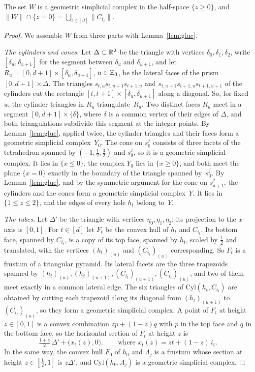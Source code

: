 \begin{lemma}\label{lem:column}
The set $W$ is a geometric simplicial complex in the half-space $\{z\ge0\}$, and $\lVert W\rVert\cap{\{z=0\}}=\bigcup_{t\in[d]}\lVert C_{i_t}\rVert$.
\end{lemma}

\begin{proof}
We assemble $W$ from three parts with Lemma~\ref{lem:glue}.

\emph{The cylinders and cones.}
Let $\Delta\subset\mathbb{R}^2$ be the triangle with vertices $\delta_0,\delta_1,\delta_2$, write $[\delta_u,\delta_{u+1}]$ for the segment between $\delta_u$ and $\delta_{u+1}$, and let $R_u=[0,d+1]\times[\delta_u,\delta_{u+1}]$, $u\in\mathbb{Z}_3$, be the lateral faces of the prism $[0,d+1]\times\Delta$.
The triangles $s_{t,u}s_{t,u+1}s_{t+1,u}$ and $s_{t,u+1}s_{t+1,u}s_{t+1,u+1}$ of the cylinders cut the rectangle $[t,t+1]\times[\delta_u,\delta_{u+1}]$ along a diagonal.
So, for fixed~$u$, the cylinder triangles in $R_u$ triangulate~$R_u$.
Two distinct faces $R_u$ meet in a segment $[0,d+1]\times\{\delta\}$, where $\delta$ is a common vertex of their edges of $\Delta$, and both triangulations subdivide this segment at the integer points.
By Lemma~\ref{lem:glue}, applied twice, the cylinder triangles and their faces form a geometric simplicial complex~$Y_0$.
The cone on $s^j_0$ consists of three facets of the tetrahedron spanned by $(-1,\frac12,\frac32)$ and $s^j_0$, so it is a geometric simplicial complex.
It lies in $\{x\le0\}$, the complex $Y_0$ lies in $\{x\ge0\}$, and both meet the plane $\{x=0\}$ exactly in the boundary of the triangle spanned by~$s^j_0$.
By Lemma~\ref{lem:glue}, and by the symmetric argument for the cone on $s^j_{d+1}$, the cylinders and the cones form a geometric simplicial complex~$Y$.
It lies in $\{1\le z\le 2\}$, and the edges of every hole $h_t$ belong to~$Y$.

\emph{The tubes.}
Let $\Delta'$ be the triangle with vertices $\eta_0,\eta_1,\eta_2$; its projection to the $x$-axis is $[0,1]$.
For $t\in[d]$ let $F_t$ be the convex hull of $h_t$ and $C_{i_t}$.
Its bottom face, spanned by $C_{i_t}$, is a copy of its top face, spanned by $h_t$, scaled by $\frac12$ and translated, with the vertices $(h_t)_{(u)}$ and $(C_{i_t})_{(u)}$ corresponding.
So $F_t$ is a frustum of a triangular pyramid.
Its lateral facets are the three trapezoids spanned by $(h_t)_{(u)},(h_t)_{(u+1)},(C_{i_t})_{(u+1)},(C_{i_t})_{(u)}$, and two of them meet exactly in a common lateral edge.
The six triangles of $\mathrm{Cyl}(h_t,C_{i_t})$ are obtained by cutting each trapezoid along its diagonal from $(h_t)_{(u+1)}$ to $(C_{i_t})_{(u)}$, so they form a geometric simplicial complex.
A point of $F_t$ at height $z\in[0,1]$ is a convex combination $zp+(1-z)q$ with $p$ in the top face and $q$ in the bottom face, so the horizontal section of $F_t$ at height $z$ is
\begin{equation}\label{eq:section}
  \tfrac{1+z}{2}\,\Delta'+\bigl(x_t(z),0\bigr),\qquad\text{where } x_t(z)=zt+(1-z)\,i_t.
\end{equation}
In the same way, the convex hull $F_0$ of $h_0$ and $\Lambda_j$ is a frustum whose section at height $z\in[\frac12,1]$ is $z\Delta'$, and $\mathrm{Cyl}(h_0,\Lambda_j)$ is a geometric simplicial complex.


\end{proof}
